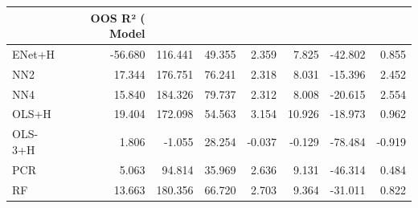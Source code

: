 \begin{tabular}{lrrrrrrr}
\toprule
 & OOS R² (%
Model &  &  &  &  &  &  &  \\
\midrule
ENet+H & -56.680 & 116.441 & 49.355 & 2.359 & 7.825 & -42.802 & 0.855 \\
NN2 & 17.344 & 176.751 & 76.241 & 2.318 & 8.031 & -15.396 & 2.452 \\
NN4 & 15.840 & 184.326 & 79.737 & 2.312 & 8.008 & -20.615 & 2.554 \\
OLS+H & 19.404 & 172.098 & 54.563 & 3.154 & 10.926 & -18.973 & 0.962 \\
OLS-3+H & 1.806 & -1.055 & 28.254 & -0.037 & -0.129 & -78.484 & -0.919 \\
PCR & 5.063 & 94.814 & 35.969 & 2.636 & 9.131 & -46.314 & 0.484 \\
RF & 13.663 & 180.356 & 66.720 & 2.703 & 9.364 & -31.011 & 0.822 \\
\bottomrule
\end{tabular}

